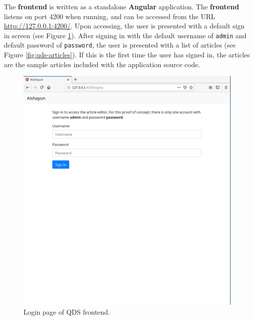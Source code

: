 \documentclass[12pt]{report}
\begin{document}
The \textbf{frontend} is written as a standalone \textbf{Angular} application.
The \textbf{frontend} listens on port 4200 when running, and can be accessed
from the URL \url{http://127.0.0.1:4200/}. Upon accessing, the user is presented
with a default sign in screen (see Figure \ref{fig:qds-login}). After signing in
with the default username of \texttt{admin} and default password of
\texttt{password}, the user is presented with a list of articles (see Figure
\ref{fig:qds-articles}). If this is the first time the user has signed in, the
articles are the sample articles included with the application source code.

\begin{figure}
    \centering
    \includegraphics[scale=0.4]{images/qds-login.png}
    \caption{Login page of QDS frontend.}
    \label{fig:qds-login}
\end{figure}
\end{document}
